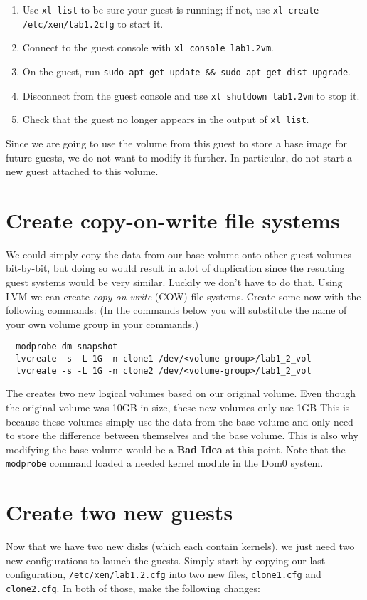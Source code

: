 \documentclass{article}
\begin{document}
\begin{enumerate}
  \item Use \texttt{xl list} to be sure your guest is running; if not, use \texttt{xl create /etc/xen/lab1.2cfg} to start it.
  \item Connect to the guest console with \texttt{xl console lab1.2vm}.
  \item On the guest, run \texttt{sudo apt-get update \&\& sudo apt-get dist-upgrade}.
  \item Disconnect from the guest console and use \texttt{xl shutdown lab1.2vm} to stop it.
  \item Check that the guest no longer appears in the output of \texttt{xl list}.
\end{enumerate}

Since we are going to use the volume from this guest to store a base image for future guests, we do not want to modify it further. In particular, do not start a new guest attached to this volume.

\section{Create copy-on-write file systems}
We could simply copy the data from our base volume onto other guest volumes bit-by-bit, but doing so would result in a.lot of duplication since the resulting guest systems would be very similar. Luckily we don't have to do that. Using LVM we can create \emph{copy-on-write} (COW) file systems. Create some now with the following  commands: (In the commands below you will substitute the name of your own volume group in your commands.)

\begin{verbatim}
  modprobe dm-snapshot
  lvcreate -s -L 1G -n clone1 /dev/<volume-group>/lab1_2_vol 
  lvcreate -s -L 1G -n clone2 /dev/<volume-group>/lab1_2_vol
\end{verbatim}

The creates two new logical volumes based on our original volume. Even though the original volume was 10GB in size, these new volumes only use 1GB This is because these volumes simply use the data from the base volume and only need to store the difference between themselves and the base volume. This is also why modifying the base volume would be a \textbf{Bad Idea} at this point. Note that the \texttt{modprobe} command loaded a needed kernel module in the Dom0 system.

\section{Create two new guests}
Now that we have two new disks (which each contain kernels), we just need two new configurations to launch the guests. Simply start by copying our last configuration, \texttt{/etc/xen/lab1.2.cfg} into two new files, \texttt{clone1.cfg} and \texttt{clone2.cfg}. In both of those, make the following changes:
\end{document}
